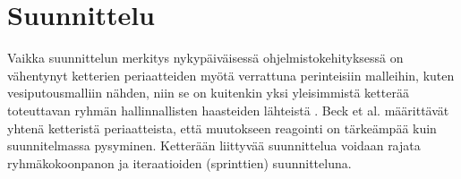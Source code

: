 \chapter{Suunnittelu}

Vaikka suunnittelun merkitys nykypäiväisessä ohjelmistokehityksessä on vähentynyt ketterien periaatteiden myötä verrattuna perinteisiin malleihin, kuten vesiputousmalliin nähden, niin se on kuitenkin yksi yleisimmistä ketterää toteuttavan ryhmän hallinnallisten haasteiden lähteistä \cite{7872736}. Beck et al. \cite{beck2001agile} määrittävät yhtenä ketteristä periaatteista, että muutokseen reagointi on tärkeämpää kuin suunnitelmassa pysyminen. Ketterään liittyvää suunnittelua voidaan rajata ryhmäkokoonpanon ja iteraatioiden (sprinttien) suunnitteluna. 
